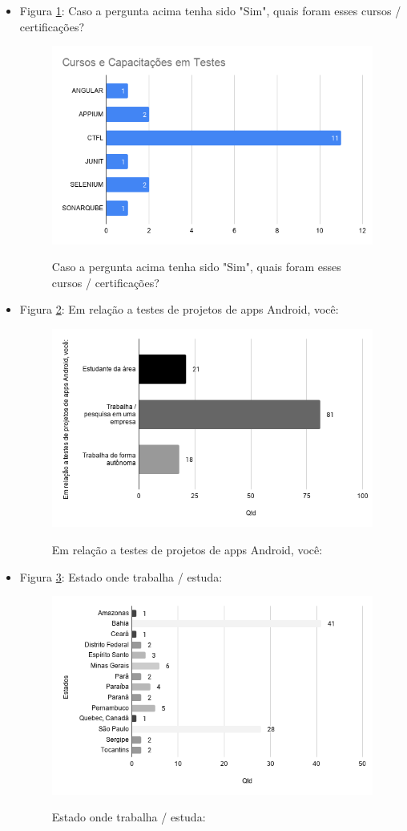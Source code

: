 \begin{itemize}
    
    \item Figura \ref{figure:s_certificacaodesc}: Caso a pergunta acima tenha sido "Sim", quais foram esses cursos / certificações?
    \begin{figure}[!htb]
    \centering
    \includegraphics[width=.80\textwidth]{images/s_certificacaodesc.png}
    \label{figure:s_certificacaodesc}
    \caption{Caso a pergunta acima tenha sido "Sim", quais foram esses cursos / certificações?}
    \end{figure}
    
    
    \item Figura \ref{figure:s_projetos}: Em relação a testes de projetos de apps Android, você:
    \begin{figure}[!htb]
    \centering
    \includegraphics[width=.55\textwidth]{images/s_projetos.png}
    \label{figure:s_projetos}
    \caption{Em relação a testes de projetos de apps Android, você:}
    \end{figure}
    
    
    \item Figura \ref{figure:s_estado}: Estado onde trabalha / estuda:
    \begin{figure}[!htb]
    \centering
    \includegraphics[width=.55\textwidth]{images/s_estado.png}
    \label{figure:s_estado}
    \caption{Estado onde trabalha / estuda:}
    \end{figure}



\end{itemize}
